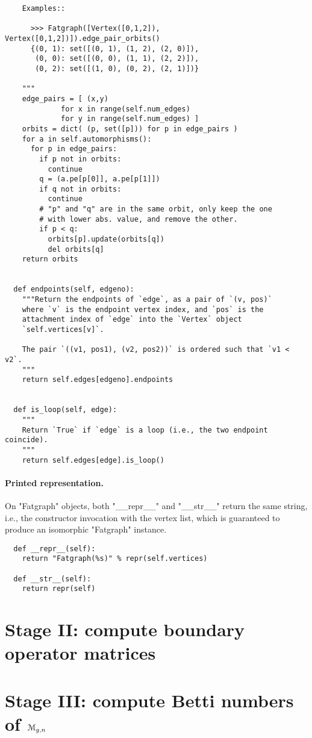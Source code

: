 \begin{lstlisting}
    Examples::

      >>> Fatgraph([Vertex([0,1,2]), Vertex([0,1,2])]).edge_pair_orbits()
      {(0, 1): set([(0, 1), (1, 2), (2, 0)]),
       (0, 0): set([(0, 0), (1, 1), (2, 2)]),
       (0, 2): set([(1, 0), (0, 2), (2, 1)])}
      
    """
    edge_pairs = [ (x,y) 
             for x in range(self.num_edges)
             for y in range(self.num_edges) ]
    orbits = dict( (p, set([p])) for p in edge_pairs )
    for a in self.automorphisms():
      for p in edge_pairs:
        if p not in orbits:
          continue
        q = (a.pe[p[0]], a.pe[p[1]])
        if q not in orbits:
          continue
        # "p" and "q" are in the same orbit, only keep the one
        # with lower abs. value, and remove the other.
        if p < q:
          orbits[p].update(orbits[q])
          del orbits[q]
    return orbits


  def endpoints(self, edgeno):
    """Return the endpoints of `edge`, as a pair of `(v, pos)`
    where `v` is the endpoint vertex index, and `pos` is the
    attachment index of `edge` into the `Vertex` object
    `self.vertices[v]`.

    The pair `((v1, pos1), (v2, pos2))` is ordered such that `v1 < v2`.
    """
    return self.edges[edgeno].endpoints


  def is_loop(self, edge):
    """
    Return `True` if `edge` is a loop (i.e., the two endpoint coincide).
    """
    return self.edges[edge].is_loop()
\end{lstlisting}


\paragraph{Printed representation.}
On "Fatgraph" objects, both "__repr__" and "__str__" return the
same string, i.e., the constructor invocation with the vertex list,
which is guaranteed to produce an isomorphic "Fatgraph" instance.
\begin{lstlisting}
  def __repr__(self):
    return "Fatgraph(%s)" % repr(self.vertices)
  
  def __str__(self):
    return repr(self)

\end{lstlisting}



\section[Stage II]{Stage II: compute boundary operator matrices}
\label{sec:stage-ii}

\section[Stage III]{Stage III: compute Betti numbers of $\mathcal{M}_{g,n}$}
\label{sec:stage-iii}



